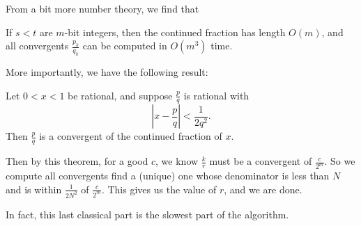 From a bit more number theory, we find that
\begin{fact}
  If $s < t$ are $m$-bit integers, then the continued fraction has length $O(m)$, and all convergents $\frac{p_k}{q_k}$ can be computed in $O(m^3)$ time.
\end{fact}

More importantly, we have the following result:
\begin{fact}
  Let $0 < x < 1$ be rational, and suppose $\frac{p}{q}$ is rational with
  \[
    \left|x - \frac{p}{q}\right| < \frac{1}{2q^2}.
  \]
  Then $\frac{p}{q}$ is a convergent of the continued fraction of $x$.
\end{fact}

Then by this theorem, for a good $c$, we know $\frac{k}{r}$ must be a convergent of $\frac{c}{2^m}$. So we compute all convergents find a (unique) one whose denominator is less than $N$ and is within $\frac{1}{2N^2}$ of $\frac{c}{2^m}$. This gives us the value of $r$, and we are done.

In fact, this last classical part is the slowest part of the algorithm.

